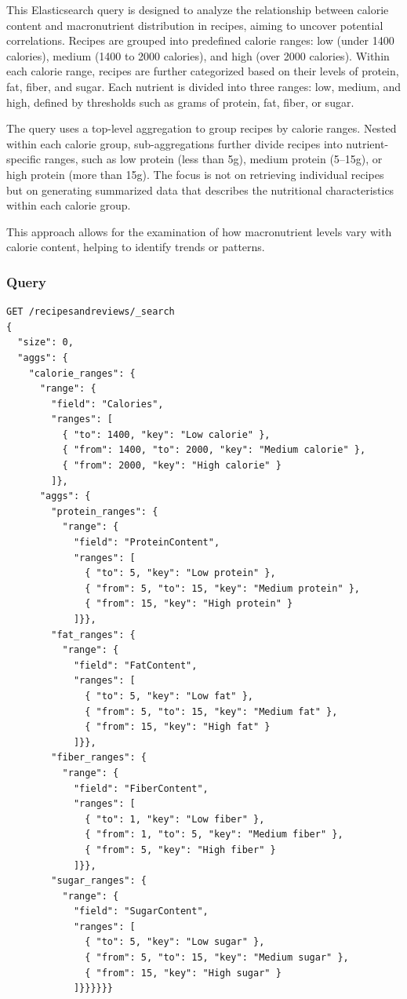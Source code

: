 \begin{enumerate}
    This Elasticsearch query is designed to analyze the relationship between calorie content and macronutrient distribution in recipes, aiming to uncover potential correlations. Recipes are grouped into predefined calorie ranges: low (under 1400 calories), medium (1400 to 2000 calories), and high (over 2000 calories). Within each calorie range, recipes are further categorized based on their levels of protein, fat, fiber, and sugar. Each nutrient is divided into three ranges: low, medium, and high, defined by thresholds such as grams of protein, fat, fiber, or sugar.

    The query uses a top-level aggregation to group recipes by calorie ranges. Nested within each calorie group, sub-aggregations further divide recipes into nutrient-specific ranges, such as low protein (less than 5g), medium protein (5–15g), or high protein (more than 15g). The focus is not on retrieving individual recipes but on generating summarized data that describes the nutritional characteristics within each calorie group.

    This approach allows for the examination of how macronutrient levels vary with calorie content, helping to identify trends or patterns.

    \subsubsection{Query}
    \begin{lstlisting}[language=Elasticsearch]
GET /recipesandreviews/_search
{
  "size": 0,
  "aggs": {
    "calorie_ranges": {
      "range": {
        "field": "Calories",
        "ranges": [
          { "to": 1400, "key": "Low calorie" },
          { "from": 1400, "to": 2000, "key": "Medium calorie" },
          { "from": 2000, "key": "High calorie" }
        ]},
      "aggs": {
        "protein_ranges": {
          "range": {
            "field": "ProteinContent",
            "ranges": [
              { "to": 5, "key": "Low protein" },
              { "from": 5, "to": 15, "key": "Medium protein" },
              { "from": 15, "key": "High protein" }
            ]}},
        "fat_ranges": {
          "range": {
            "field": "FatContent",
            "ranges": [
              { "to": 5, "key": "Low fat" },
              { "from": 5, "to": 15, "key": "Medium fat" },
              { "from": 15, "key": "High fat" }
            ]}},
        "fiber_ranges": {
          "range": {
            "field": "FiberContent",
            "ranges": [
              { "to": 1, "key": "Low fiber" },
              { "from": 1, "to": 5, "key": "Medium fiber" },
              { "from": 5, "key": "High fiber" }
            ]}},
        "sugar_ranges": {
          "range": {
            "field": "SugarContent",
            "ranges": [
              { "to": 5, "key": "Low sugar" },
              { "from": 5, "to": 15, "key": "Medium sugar" },
              { "from": 15, "key": "High sugar" }
            ]}}}}}}
    \end{lstlisting}


\end{enumerate}
